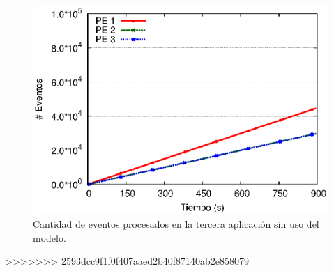 \begin{figure}[!ht]
\centering
    \includegraphics[scale=0.75]{images/exp/app3/sm/logical/eventCount.eps}
    \caption{Cantidad de eventos procesados en la tercera aplicaci\'on sin uso del modelo.}
    \label{fig:app3-eventCount-sm}
\end{figure}

>>>>>>> 2593dcc9f1f0f407aaed2b40f87140ab2e858079

